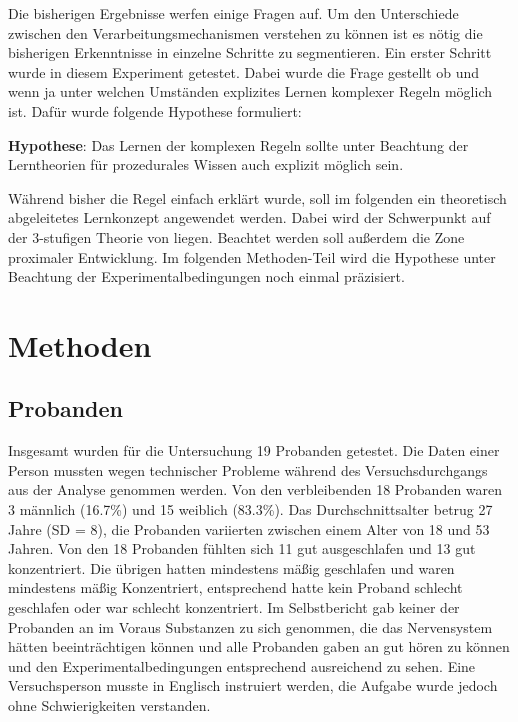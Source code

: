 \documentclass[doc,a4paper,12pt]{apa6}
\begin{document}
Die bisherigen Ergebnisse werfen einige Fragen auf. Um den Unterschiede zwischen den Verarbeitungsmechanismen verstehen zu können ist es nötig die bisherigen Erkenntnisse in einzelne Schritte zu segmentieren. Ein erster Schritt wurde in diesem Experiment getestet. Dabei wurde die Frage gestellt ob und wenn ja unter welchen Umständen explizites Lernen komplexer Regeln möglich ist. Dafür wurde folgende Hypothese formuliert:

\textbf{Hypothese}: Das Lernen der komplexen Regeln sollte unter Beachtung der Lerntheorien für prozedurales Wissen auch explizit möglich sein.

Während bisher die Regel einfach erklärt wurde, soll im folgenden ein theoretisch abgeleitetes Lernkonzept angewendet werden. Dabei wird der Schwerpunkt auf der 3-stufigen Theorie von \textcite{fitts1967human} liegen. Beachtet werden soll außerdem die Zone proximaler Entwicklung. Im folgenden Methoden-Teil wird die Hypothese unter Beachtung der Experimentalbedingungen noch einmal präzisiert.


\section{Methoden}

\subsection{Probanden}

Insgesamt wurden für die Untersuchung 19 Probanden getestet. Die Daten einer Person mussten wegen technischer Probleme während des Versuchsdurchgangs aus der Analyse genommen werden. Von den verbleibenden 18 Probanden waren 3 männlich (16.7\%) und 15 weiblich (83.3\%). Das Durchschnittsalter betrug 27 Jahre (SD = 8), die Probanden variierten zwischen einem Alter von 18 und 53 Jahren. Von den 18 Probanden fühlten sich 11 gut ausgeschlafen und 13 gut konzentriert. Die übrigen hatten mindestens mäßig geschlafen und waren mindestens mäßig Konzentriert, entsprechend hatte kein Proband schlecht geschlafen oder war schlecht konzentriert. Im Selbstbericht gab keiner der Probanden an im Voraus Substanzen zu sich genommen, die das Nervensystem hätten beeinträchtigen können und alle Probanden gaben an gut hören zu können und den Experimentalbedingungen entsprechend ausreichend zu sehen. Eine Versuchsperson musste in Englisch instruiert werden, die Aufgabe wurde jedoch ohne Schwierigkeiten verstanden.
\end{document}
